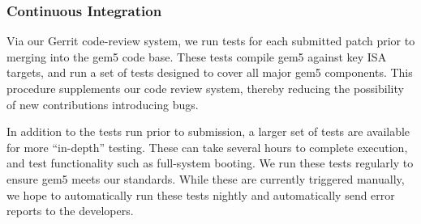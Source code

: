 \subsubsection{Continuous Integration}

Via our Gerrit code-review system, we run tests for each
submitted patch prior to merging into the gem5 code base. These tests
compile gem5 against key ISA targets, and run a set of tests designed to cover all
major gem5 components. This procedure supplements our code review system, thereby
reducing the possibility of new contributions introducing bugs.

In addition to the tests run prior to submission, a larger set of tests are
available for more ``in-depth'' testing. These can take several hours to complete
execution, and  test functionality such as
full-system booting. We run these tests regularly to ensure gem5 meets our
standards. While these are currently triggered manually, we hope to
automatically run these tests nightly and automatically send error reports to
the developers.
